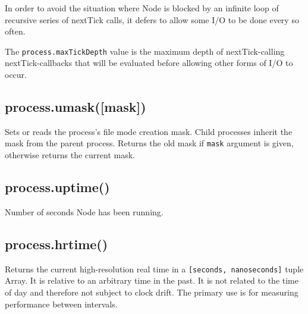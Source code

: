 In order to avoid the situation where Node is blocked by an infinite
loop of recursive series of nextTick calls, it defers to allow some I/O
to be done every so often.

The \texttt{process.maxTickDepth} value is the maximum depth of
nextTick-calling nextTick-callbacks that will be evaluated before
allowing other forms of I/O to occur.

\subsection{process.umask({[}mask{]})}

Sets or reads the process's file mode creation mask. Child processes
inherit the mask from the parent process. Returns the old mask if
\texttt{mask} argument is given, otherwise returns the current mask.

\begin{Shaded}
\begin{Highlighting}[]
 \NormalTok{;}

\NormalTok{(} \NormalTok{+ }\NormalTok{(}\NormalTok{) +}
             \NormalTok{+ }\NormalTok{(}\NormalTok{));}
\end{Highlighting}
\end{Shaded}

\subsection{process.uptime()}

Number of seconds Node has been running.

\subsection{process.hrtime()}

Returns the current high-resolution real time in a
\texttt{{[}seconds, nanoseconds{]}} tuple Array. It is relative to an
arbitrary time in the past. It is not related to the time of day and
therefore not subject to clock drift. The primary use is for measuring
performance between intervals.

